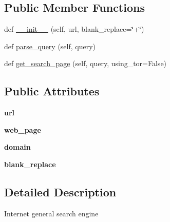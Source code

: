 \subsection*{Public Member Functions}
\begin{DoxyCompactItemize}
\item 
def \hyperlink{classhal_1_1internet_1_1engines_1_1_search_engine_afa48d729c2ecd0ba30a56544dd3951ea}{\+\_\+\+\_\+init\+\_\+\+\_\+} (self, url, blank\+\_\+replace=\char`\"{}+\char`\"{})
\item 
def \hyperlink{classhal_1_1internet_1_1engines_1_1_search_engine_afde9fa1646b6057ecd94746132c9b7c1}{parse\+\_\+query} (self, query)
\item 
def \hyperlink{classhal_1_1internet_1_1engines_1_1_search_engine_a05d68c392a6d698cd59df41927ddbc90}{get\+\_\+search\+\_\+page} (self, query, using\+\_\+tor=False)
\end{DoxyCompactItemize}
\subsection*{Public Attributes}
\begin{DoxyCompactItemize}
\item 
{\bfseries url}\hypertarget{classhal_1_1internet_1_1engines_1_1_search_engine_a2b16e6f92de3d9dd64d1c51efbd8717d}{}\label{classhal_1_1internet_1_1engines_1_1_search_engine_a2b16e6f92de3d9dd64d1c51efbd8717d}

\item 
{\bfseries web\+\_\+page}\hypertarget{classhal_1_1internet_1_1engines_1_1_search_engine_abb2f49a429aa664261c55de3a953b7ce}{}\label{classhal_1_1internet_1_1engines_1_1_search_engine_abb2f49a429aa664261c55de3a953b7ce}

\item 
{\bfseries domain}\hypertarget{classhal_1_1internet_1_1engines_1_1_search_engine_a96f97387f7a035a12cb1509288b5401a}{}\label{classhal_1_1internet_1_1engines_1_1_search_engine_a96f97387f7a035a12cb1509288b5401a}

\item 
{\bfseries blank\+\_\+replace}\hypertarget{classhal_1_1internet_1_1engines_1_1_search_engine_a28184626d85a0e6a0af8f3a2e381cf7f}{}\label{classhal_1_1internet_1_1engines_1_1_search_engine_a28184626d85a0e6a0af8f3a2e381cf7f}

\end{DoxyCompactItemize}


\subsection{Detailed Description}
\begin{DoxyVerb}Internet general search engine \end{DoxyVerb}
 

